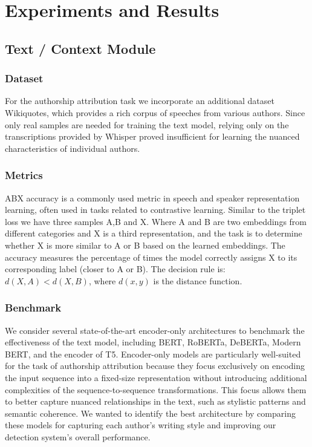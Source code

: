\documentclass{Interspeech}
\begin{document}
\section{Experiments and Results}\label{sec:experiments_results}


\subsection{Text / Context Module}
\subsubsection{Dataset}
For the authorship attribution task we incorporate an additional dataset
Wikiquotes, which provides a rich corpus of speeches from various authors.
Since only real samples are needed for training the text model, relying only on
the transcriptions provided by Whisper proved insufficient for learning the
nuanced characteristics of individual authors. \\
\subsubsection{Metrics}
ABX accuracy is a commonly used metric in speech and speaker representation
learning, often used in tasks related to contrastive learning. Similar to the
triplet loss we have three samples A,B and X. Where A and B are two embeddings
from different categories and X is a third representation, and the task is to
determine whether X is more similar to A or B based on the learned embeddings.
The accuracy measures the percentage of times the model correctly assigns X to
its corresponding label (closer to A or B). The decision rule is: $d(X,A) <
  d(X,B)$, where $d(x,y)$ is the distance function. \\
\subsubsection{Benchmark} We consider several state-of-the-art encoder-only architectures to benchmark
the effectiveness of the text model, including BERT, RoBERTa, DeBERTa, Modern
BERT, and the encoder of T5. Encoder-only models are particularly well-suited
for the task of authorship attribution because they focus exclusively on
encoding the input sequence into a fixed-size representation without
introducing additional complexities of the sequence-to-sequence
transformations. This focus allows them to better capture nuanced relationships
in the text, such as stylistic patterns and semantic coherence. We wanted to
identify the best architecture by comparing these models for capturing each
author's writing style and improving our detection system's overall
performance.
\end{document}
